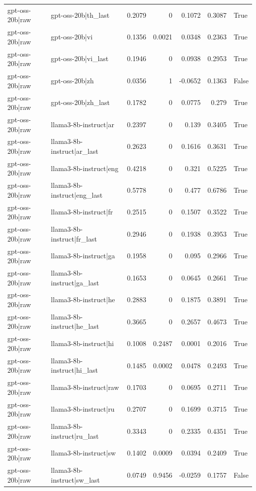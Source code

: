\begin{table}
\begin{tabular}{l l r r r r l}
gpt-oss-20b|raw & gpt-oss-20b|th_last & 0.2079 & 0 & 0.1072 & 0.3087 & True \\
gpt-oss-20b|raw & gpt-oss-20b|vi & 0.1356 & 0.0021 & 0.0348 & 0.2363 & True \\
gpt-oss-20b|raw & gpt-oss-20b|vi_last & 0.1946 & 0 & 0.0938 & 0.2953 & True \\
gpt-oss-20b|raw & gpt-oss-20b|zh & 0.0356 & 1 & -0.0652 & 0.1363 & False \\
gpt-oss-20b|raw & gpt-oss-20b|zh_last & 0.1782 & 0 & 0.0775 & 0.279 & True \\
gpt-oss-20b|raw & llama3-8b-instruct|ar & 0.2397 & 0 & 0.139 & 0.3405 & True \\
gpt-oss-20b|raw & llama3-8b-instruct|ar_last & 0.2623 & 0 & 0.1616 & 0.3631 & True \\
gpt-oss-20b|raw & llama3-8b-instruct|eng & 0.4218 & 0 & 0.321 & 0.5225 & True \\
gpt-oss-20b|raw & llama3-8b-instruct|eng_last & 0.5778 & 0 & 0.477 & 0.6786 & True \\
gpt-oss-20b|raw & llama3-8b-instruct|fr & 0.2515 & 0 & 0.1507 & 0.3522 & True \\
gpt-oss-20b|raw & llama3-8b-instruct|fr_last & 0.2946 & 0 & 0.1938 & 0.3953 & True \\
gpt-oss-20b|raw & llama3-8b-instruct|ga & 0.1958 & 0 & 0.095 & 0.2966 & True \\
gpt-oss-20b|raw & llama3-8b-instruct|ga_last & 0.1653 & 0 & 0.0645 & 0.2661 & True \\
gpt-oss-20b|raw & llama3-8b-instruct|he & 0.2883 & 0 & 0.1875 & 0.3891 & True \\
gpt-oss-20b|raw & llama3-8b-instruct|he_last & 0.3665 & 0 & 0.2657 & 0.4673 & True \\
gpt-oss-20b|raw & llama3-8b-instruct|hi & 0.1008 & 0.2487 & 0.0001 & 0.2016 & True \\
gpt-oss-20b|raw & llama3-8b-instruct|hi_last & 0.1485 & 0.0002 & 0.0478 & 0.2493 & True \\
gpt-oss-20b|raw & llama3-8b-instruct|raw & 0.1703 & 0 & 0.0695 & 0.2711 & True \\
gpt-oss-20b|raw & llama3-8b-instruct|ru & 0.2707 & 0 & 0.1699 & 0.3715 & True \\
gpt-oss-20b|raw & llama3-8b-instruct|ru_last & 0.3343 & 0 & 0.2335 & 0.4351 & True \\
gpt-oss-20b|raw & llama3-8b-instruct|sw & 0.1402 & 0.0009 & 0.0394 & 0.2409 & True \\
gpt-oss-20b|raw & llama3-8b-instruct|sw_last & 0.0749 & 0.9456 & -0.0259 & 0.1757 & False \\

\end{tabular}
\end{table}
